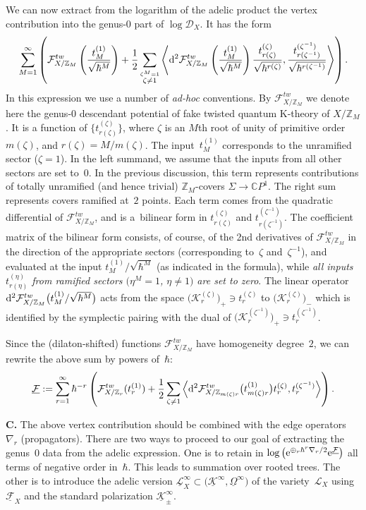 \documentclass[pdftex]{sigma}
\def\D{\mathcal D}
\def\F{\mathcal F}
\def\K{\mathcal K}
\def\L{\mathcal L}
\def\ZZ{\mathbb Z}
\def\CC{\mathbb C}
\def\h{\hbar}
\def\lan{\langle}
\def\ran{\rangle}
\def\und{\underline}
\begin{document}
We can now extract from the logarithm of the adelic product the vertex contribution into the genus-0 part of $\log \D_X$. It has the form
\[ \sum_{M=1}^{\infty} \left( \F_{X/\ZZ_M}^{tw}\left(\frac{t_M^{(1)}}{\sqrt{\h^M}}\right) + \frac{1}{2}\sum_{\stackrel{\zeta^M=1}{\zeta\neq 1}} \left\lan {\rm d}^2\F^{tw}_{X/\ZZ_M}\left(\frac{t_M^{(1)}}{\sqrt{\h^M}}\right)
\frac{t^{(\zeta)}_{r(\zeta)}}{\sqrt{\h^{r(\zeta)}}}, \frac{t^{(\zeta^{-1})}_{r(\zeta^{-1})}}{\sqrt{\h^{r(\zeta^{-1})}}} \right\ran \right) .\]
In this expression we use a number of {\em ad-hoc} conventions. By $\F_{X/\ZZ_M}^{tw}$ we denote here the genus-$0$ descendant potential of fake twisted quantum K-theory of $X/\ZZ_M$. It is a function of
$\big\{ t_{r(\zeta)}^{(\zeta)} \big\}$, where $\zeta$ is an $M$th root of unity of primitive order $m(\zeta)$, and $r(\zeta)=M/m(\zeta)$. The input~$t_M^{(1)}$
corresponds to the unramified sector ($\zeta=1$). In the left summand, we assume that the inputs from all other sectors are set to~$0$. In the previous discussion, this term represents contributions of totally unramified (and hence trivial) $\ZZ_M$-covers $\Sigma \to \CC P^1$. The right sum represents covers ramified at~$2$ points. Each term comes from the quadratic differential of $\F_{X/\ZZ_M}^{tw}$, and is a~bilinear form in $t_{r(\zeta)}^{(\zeta)}$ and $t_{r(\zeta^{-1})}^{(\zeta^{-1})}$.
The coefficient matrix of the bilinear form consists, of course, of the 2nd derivatives of $\F_{X/\ZZ_M}^{tw}$ in the direction of the appropriate sectors (corresponding to~$\zeta$ and~$\zeta^{-1}$), and evaluated at the input $t_M^{(1)}/\sqrt{\h^M}$ (as indicated in the formula), while {\em all inputs $t_{r(\eta)}^{(\eta)}$ from ramified sectors $(\eta^M=1$, $\eta \neq 1)$ are set to zero}. The linear operator ${\rm d}^2\F_{X/\ZZ_M}^{tw}\big(t_M^{(1)}/\sqrt{\h^M}\big)$ acts from
the space $\big(\K_r^{(\zeta)}\big)_{+}\ni t_r^{(\zeta)}$ to $\big(\K_r^{(\zeta)}\big)_{-}$ which is identified by the symplectic pairing with the dual of $\big(\K_r^{(\zeta^{-1})}\big)_{+}\ni t_r^{(\zeta^{-1})}$.

Since the (dilaton-shifted) functions $\F_{X/\ZZ_M}^{tw}$ have homogeneity degree~$2$, we can rewrite the above sum by powers of~$\h$:
\[ \und{\F}:=\sum_{r=1}^{\infty} \h^{-r} \left( \F_{X/\ZZ_r}^{tw}(t^{(1)}_r) +\frac{1}{2}\sum_{\zeta\neq 1}
\left\lan {\rm d}^2 \F^{tw}_{X/\ZZ_{m(\zeta)r}} \big(t_{m(\zeta)r}^{(1)}\big) t_r^{(\zeta)}, t_r^{(\zeta^{-1})}\right\ran \right) .\]

{\bf C.} The above vertex contribution should be combined with the edge operators $\nabla_r$ (propagators). There are two ways to proceed to our goal of extracting the genus~0 data from the adelic expression. One is to retain in $\log \big({\rm e}^{\oplus_r \h^r \nabla_r/2} {\rm e}^{\und{\F}}\big)$ all terms of negative order in~$\h$. This leads to summation over rooted trees. The other is to introduce the adelic version $\und{\L}^{\infty}_X \subset \big(\und{\K}^{\infty}, \und{\Omega}^{\infty}\big)$ of the variety~$\L_X$ using~$\und{\F}_X$ and the standard polarization $\und{\K}_{\pm}^{\infty}$.
\end{document}

